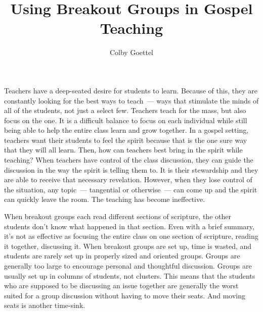 \documentclass[12pt]{article}
\title{Using Breakout Groups in Gospel Teaching}
\author{Colby Goettel}
\begin{document}
\maketitle



Teachers have a deep-seated desire for students to learn. Because of this, they are constantly looking for the best ways to teach~--- ways that stimulate the minds of all of the students, not just a select few. Teachers teach for the mass, but also focus on the one. It is a difficult balance to focus on each individual while still being able to help the entire class learn and grow together. In a gospel setting, teachers want their students to feel the spirit because that is the one sure way that they will all learn. Then, how can teachers best bring in the spirit while teaching? When teachers have control of the class discussion, they can guide the discussion in the way the spirit is telling them to. It is their stewardship and they are able to receive that necessary revelation. However, when they lose control of the situation, any topic~--- tangential or otherwise~--- can come up and the spirit can quickly leave the room. The teaching has become ineffective.

When breakout groups each read different sections of scripture, the other students don't know what happened in that section. Even with a brief summary, it's not as effective as focusing the entire class on one section of scripture, reading it together, discussing it. When breakout groups are set up, time is wasted, and students are rarely set up in properly sized and oriented groups. Groups are generally too large to encourage personal and thoughtful discussion. Groups are usually set up in columns of students, not clusters. This means that the students who are supposed to be discussing an issue together are generally the worst suited for a group discussion without having to move their seats. And moving seats is another time-sink.
\end{document}
